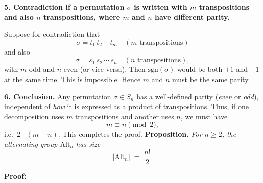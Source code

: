 \documentclass[12pt]{article}
\theoremstyle{definition} %
\theoremstyle{plain} %
\begin{document}
\medskip

\noindent
\textbf{5. Contradiction if a permutation $\sigma$ is written with $m$ transpositions and also $n$ transpositions, where $m$ and $n$ have different parity.}

Suppose for contradiction that
\[
\sigma = t_1 \, t_2 \,\cdots\, t_m 
\quad(\text{$m$ transpositions})
\]
and also
\[
\sigma = s_1 \, s_2 \,\cdots\, s_n
\quad(\text{$n$ transpositions}),
\]
with $m$ odd and $n$ even (or vice versa). Then $\mathrm{sgn}(\sigma)$ would be both $+1$ and $-1$ at the same time.  This is impossible. Hence $m$ and $n$ must be the same parity. 

\medskip

\noindent
\textbf{6. Conclusion.} 
Any permutation $\sigma\in S_n$ has a well-defined parity (\emph{even} or \emph{odd}), independent of \emph{how} it is expressed as a product of transpositions. Thus, if one decomposition uses $m$ transpositions and another uses $n$, we must have 
\[
m \equiv n \pmod{2},
\]
i.e.\ $2 \mid (m-n)$. This completes the proof.
\noindent
\textbf{Proposition.} \emph{For $n \ge 2$, the alternating group $\mathrm{Alt}_n$ has size 
\[
|\mathrm{Alt}_n| \;=\; \frac{n!}{2}.
\]}

\bigskip

\noindent
\textbf{Proof:}
\end{document}
